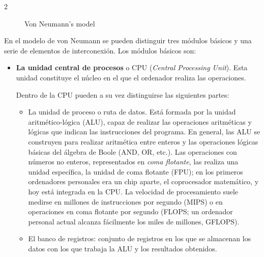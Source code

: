 \begin{paracol}{2}
\begin{figure}[ht]
	\renewcommand{\figurename}{Figure}
	\caption{Von Neumann's model}
	\label{fig:vonne}
\end{figure}

\switchcolumn
En el modelo de von Neumann se pueden distinguir tres módulos básicos y una serie de elementos de interconexión. Los módulos básicos son:

\begin{itemize}
\item \textbf{La unidad central de procesos} o CPU  (\emph{Central Processing Unit}). Esta unidad constituye el núcleo en el que el ordenador realiza las operaciones.

Dentro de la CPU pueden a su vez distinguirse las siguientes partes:

\begin{itemize}

\item La unidad de proceso o ruta de datos. Está formada por la unidad aritmético-lógica (ALU),  capaz de realizar las operaciones aritméticas y lógicas que indican las instrucciones del programa. En general, las ALU se construyen para realizar aritmética entre enteros y las operaciones lógicas básicas del álgebra de Boole (AND, OR, etc.). Las operaciones con números no enteros, representados en \emph{coma flotante}, las realiza una unidad específica, la unidad de coma flotante (FPU); en los primeros ordenadores personales era un chip aparte, el coprocesador matemático, y hoy está integrada en la CPU. La velocidad de procesamiento suele medirse en millones de instrucciones por segundo (MIPS) o en operaciones en coma flotante por segundo (FLOPS; un ordenador personal actual alcanza fácilmente los miles de millones, GFLOPS).

\item El banco de registros: conjunto de registros en los que se almacenan los datos con los que trabaja la ALU y los resultados obtenidos.


\end{itemize}
\end{itemize}
\end{paracol}
